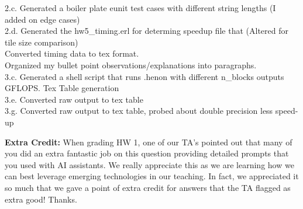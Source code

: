 \documentclass{article}
\newenvironment{answer}
{\par\color{blue}}
{\normalfont\par}
\begin{document}
\begin{enumerate}
\begin{answer}
              2.c. Generated a boiler plate eunit test cases with different string lengths (I added on edge cases) \\
              2.d. Generated the hw5\_timing.erl for determing speedup file that (Altered for tile size comparison) \\
              Converted timing data to tex format. \\
              Organized my bullet point observations/explanations into paragraphs. \\
              3.c. Generated a shell script that runs .\/henon with different n\_blocks outputs GFLOPS.
              Tex Table generation \\
              3.e. Converted raw output to tex table \\
              3.g. Converted raw output to tex table, probed about double precision less speed-up \\
          \end{answer}
          \par
          \textbf{Extra Credit:} When grading HW 1, one of our TA's pointed out that many of
          you did an extra fantastic job on this question providing detailed prompts that
          you used with AI assistants.  We really appreciate this as we are learning how
          we can best leverage emerging technologies in our teaching.  In fact, we appreciated
          it so much that we gave a point of extra credit for answers that the TA flagged
          as extra good!  Thanks.


\end{enumerate}
\end{document}
